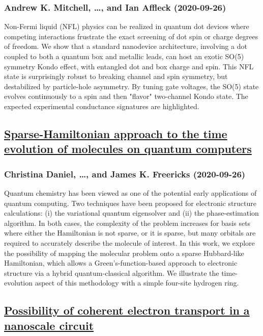 \subsubsection*{Andrew K. Mitchell, \dots, and Ian Affleck (2020-09-26)}
Non-Fermi liquid (NFL) physics can be realized in quantum dot devices where
competing interactions frustrate the exact screening of dot spin or charge
degrees of freedom. We show that a standard nanodevice architecture, involving
a dot coupled to both a quantum box and metallic leads, can host an exotic
SO(5) symmetry Kondo effect, with entangled dot and box charge and spin. This
NFL state is surprisingly robust to breaking channel and spin symmetry, but
destabilized by particle-hole asymmetry. By tuning gate voltages, the SO(5)
state evolves continuously to a spin and then "flavor" two-channel Kondo state.
The expected experimental conductance signatures are highlighted.

\subsection*{\href{http://arxiv.org/abs/2009.12679v1}{Sparse-Hamiltonian approach to the time evolution of molecules on  quantum computers}}
\subsubsection*{Christina Daniel, \dots, and James K. Freericks (2020-09-26)}
Quantum chemistry has been viewed as one of the potential early applications
of quantum computing. Two techniques have been proposed for electronic
structure calculations: (i) the variational quantum eigensolver and (ii) the
phase-estimation algorithm. In both cases, the complexity of the problem
increases for basis sets where either the Hamiltonian is not sparse, or it is
sparse, but many orbitals are required to accurately describe the molecule of
interest. In this work, we explore the possibility of mapping the molecular
problem onto a sparse Hubbard-like Hamiltonian, which allows a
Green's-function-based approach to electronic structure via a hybrid
quantum-classical algorithm. We illustrate the time-evolution aspect of this
methodology with a simple four-site hydrogen ring.

\subsection*{\href{http://arxiv.org/abs/2009.12676v1}{Possibility of coherent electron transport in a nanoscale circuit}}
